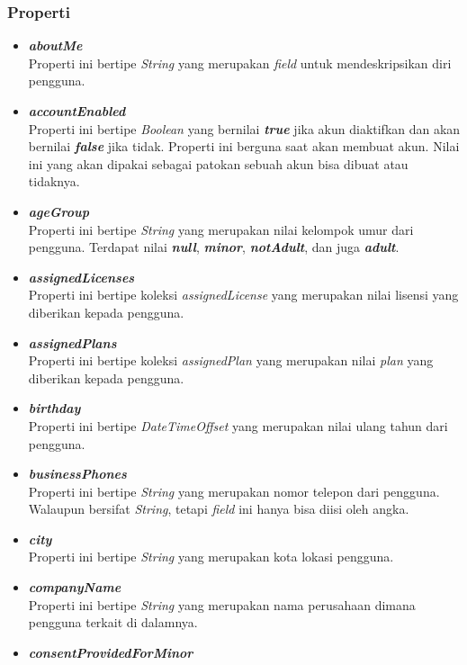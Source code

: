 \subsubsection{Properti}
\begin{itemize}
	\item \textbf{\textit{aboutMe}}\\
	Properti ini bertipe \textit{String} yang merupakan \textit{field} untuk mendeskripsikan diri pengguna. 
	\item \textbf{\textit{accountEnabled}}\\
	Properti ini bertipe \textit{Boolean} yang bernilai \textbf{\textit{true}} jika akun diaktifkan dan akan bernilai \textbf{\textit{false}} jika tidak. Properti ini berguna saat akan membuat akun. Nilai ini yang akan dipakai sebagai patokan sebuah akun bisa dibuat atau tidaknya. 
	\item \textbf{\textit{ageGroup}}\\
	Properti ini bertipe \textit{String} yang merupakan nilai kelompok umur dari pengguna. Terdapat nilai \textbf{\textit{null}}, \textbf{\textit{minor}}, \textbf{\textit{notAdult}}, dan juga \textbf{\textit{adult}}.
	\item \textbf{\textit{assignedLicenses}}\\
	Properti ini bertipe koleksi \textit{assignedLicense} yang merupakan nilai lisensi yang diberikan kepada pengguna.
	\item \textbf{\textit{assignedPlans}}\\
	Properti ini bertipe koleksi \textit{assignedPlan} yang merupakan nilai \textit{plan} yang diberikan kepada pengguna.
	\item \textbf{\textit{birthday}}\\
	Properti ini bertipe \textit{DateTimeOffset} yang merupakan nilai ulang tahun dari pengguna. 
	\item \textbf{\textit{businessPhones}}\\
	Properti ini bertipe \textit{String} yang merupakan nomor telepon dari pengguna. Walaupun bersifat \textit{String}, tetapi \textit{field} ini hanya bisa diisi oleh angka.
	\item \textbf{\textit{city}}\\
	Properti ini bertipe \textit{String} yang merupakan kota lokasi pengguna.
	\item \textbf{\textit{companyName}}\\
	Properti ini bertipe \textit{String} yang merupakan nama perusahaan dimana pengguna terkait di dalamnya.
	\item \textbf{\textit{consentProvidedForMinor}}\\

\end{itemize}
